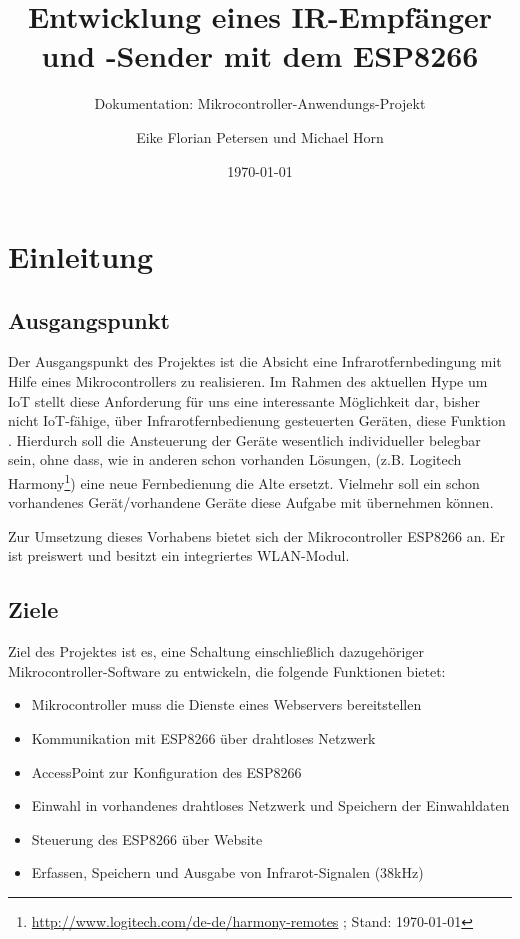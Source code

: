 			
\usepackage{tikz}			
\usetikzlibrary{shapes,arrows} %



\title{Entwicklung eines IR-Empfänger und -Sender mit dem ESP8266}
\subtitle{Dokumentation: Mikrocontroller-Anwendungs-Projekt}
\author{Eike Florian Petersen und Michael Horn} 
\date{\today}

\maketitle

\tableofcontents										%
\pagebreak
\listoffigures											%
\pagebreak

\section{Einleitung}
\subsection{Ausgangspunkt}
Der Ausgangspunkt des Projektes ist die Absicht eine Infrarotfernbedingung mit Hilfe eines Mikrocontrollers zu realisieren. 
Im Rahmen des aktuellen Hype um \acs{IoT} stellt diese Anforderung für uns eine interessante Möglichkeit dar, bisher nicht \acs{IoT}-fähige, über Infrarotfernbedienung gesteuerten Geräten, diese Funktion . Hierdurch soll die Ansteuerung der Geräte wesentlich individueller belegbar sein, ohne dass, wie in anderen schon vorhanden Lösungen, (z.B. Logitech Harmony\footnote{ \url{http://www.logitech.com/de-de/harmony-remotes} ; Stand: \today}) eine neue Fernbedienung die Alte ersetzt. Vielmehr soll ein schon vorhandenes Gerät/vorhandene Geräte diese Aufgabe mit übernehmen können.

Zur Umsetzung dieses Vorhabens bietet sich der Mikrocontroller ESP8266 an.
Er ist preiswert und besitzt ein integriertes WLAN-Modul.

\subsection{Ziele}
Ziel des Projektes ist es, eine Schaltung einschließlich dazugehöriger Mikrocontroller-Software zu entwickeln, die folgende Funktionen bietet:

\begin{itemize}
	\item Mikrocontroller muss die Dienste eines Webservers bereitstellen
	\item Kommunikation mit ESP8266 über drahtloses Netzwerk
	\item AccessPoint zur Konfiguration des ESP8266
	\item Einwahl in vorhandenes drahtloses Netzwerk und Speichern der Einwahldaten
	\item Steuerung des ESP8266 über Website
	\item Erfassen, Speichern und Ausgabe von Infrarot-Signalen (38kHz)
\end{itemize}

